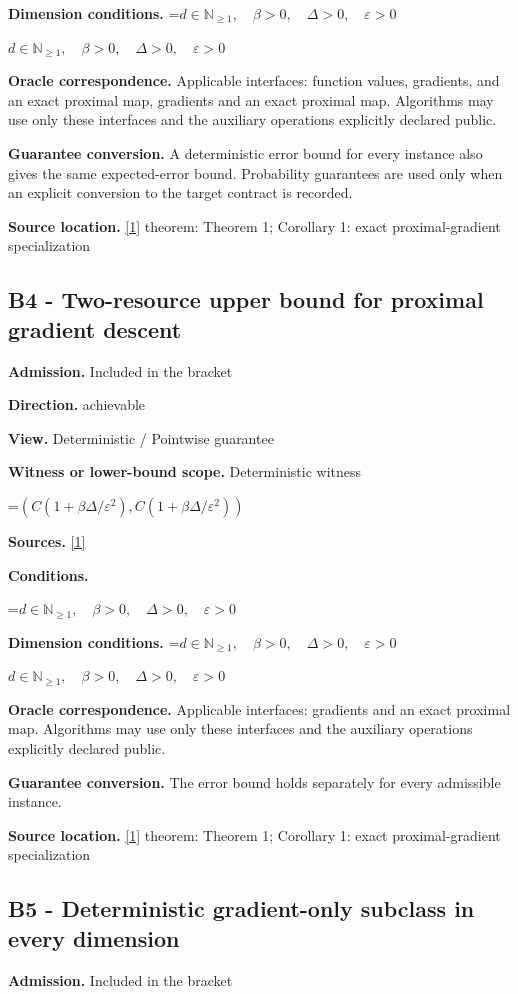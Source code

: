 \documentclass[10pt,a4paper]{article}
\newcommand{\AtlasMath}[1]{\par\begingroup\centering\setbox0=\hbox{$\displaystyle #1$}\ifdim\wd0>1.4\linewidth\typeout{ATLAS WIDE FORMULA: \the\wd0}\fi\ifdim\wd0>\linewidth\resizebox{\linewidth}{!}{\box0}\else\box0\fi\par\endgroup}
\newcommand{\AtlasInlineMath}[1]{\begingroup\setbox0=\hbox{$#1$}\ifdim\wd0>.4\linewidth\endgroup\AtlasMath{#1}\else\endgroup$#1$\fi}
\begin{document}
\textbf{Dimension conditions.} \AtlasInlineMath{d\in\mathbb{N}_{\ge1},\quad \beta>0,\quad \Delta>0,\quad \varepsilon>0}

\textbf{Oracle correspondence.} Applicable interfaces: function values, gradients, and an exact proximal map, gradients and an exact proximal map. Algorithms may use only these interfaces and the auxiliary operations explicitly declared public.

\textbf{Guarantee conversion.} A deterministic error bound for every instance also gives the same expected-error bound. Probability guarantees are used only when an explicit conversion to the target contract is recorded.

\textbf{Source location.} \href{https://arxiv.org/pdf/1308.6594}{[1]} theorem: Theorem 1; Corollary 1: exact proximal-gradient specialization

\subsection{B4 - Two-resource upper bound for proximal gradient descent}
\textbf{Admission.} Included in the bracket

\textbf{Direction.} achievable

\textbf{View.} Deterministic / Pointwise guarantee

\textbf{Witness or lower-bound scope.} Deterministic witness

\AtlasMath{(C(1+\beta\Delta/\varepsilon^2),C(1+\beta\Delta/\varepsilon^2))}
\textbf{Sources.} \href{https://arxiv.org/pdf/1308.6594}{[1]}

\textbf{Conditions.} 
\AtlasMath{d\in\mathbb{N}_{\ge1},\quad \beta>0,\quad \Delta>0,\quad \varepsilon>0}


\textbf{Dimension conditions.} \AtlasInlineMath{d\in\mathbb{N}_{\ge1},\quad \beta>0,\quad \Delta>0,\quad \varepsilon>0}

\textbf{Oracle correspondence.} Applicable interfaces: gradients and an exact proximal map. Algorithms may use only these interfaces and the auxiliary operations explicitly declared public.

\textbf{Guarantee conversion.} The error bound holds separately for every admissible instance.

\textbf{Source location.} \href{https://arxiv.org/pdf/1308.6594}{[1]} theorem: Theorem 1; Corollary 1: exact proximal-gradient specialization

\subsection{B5 - Deterministic gradient-only subclass in every dimension}
\textbf{Admission.} Included in the bracket
\end{document}
